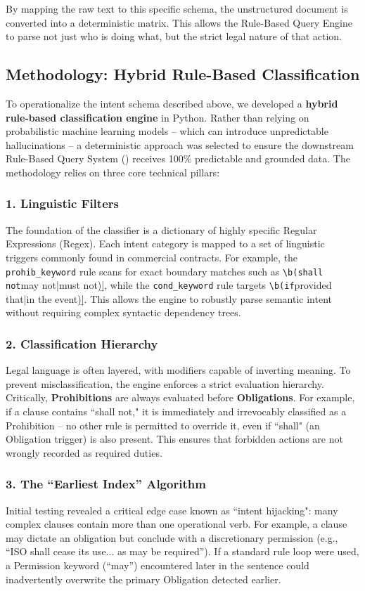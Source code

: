 \documentclass[twoside,final]{hcmut-report}
\newcommand{\result}[1]{\fcolorbox{red}{white}{#1}}
\begin{document}
By mapping the raw text to this specific schema, the unstructured document is converted into a deterministic matrix. This allows the Rule-Based Query Engine to parse not just who is doing what, but the strict legal nature of that action.

\subsection{Methodology: Hybrid Rule-Based Classification}
To operationalize the intent schema described above, we developed a \textbf{hybrid rule-based classification engine} in Python. Rather than relying on probabilistic machine learning models -- which can introduce unpredictable hallucinations -- a deterministic approach was selected to ensure the downstream Rule-Based Query System (\result{Assignment~\ref{assignment_3}}) receives 100\% predictable and grounded data. The methodology relies on three core technical pillars:

\subsubsection*{1. Linguistic Filters}
The foundation of the classifier is a dictionary of highly specific Regular Expressions (Regex). Each intent category is mapped to a set of linguistic triggers commonly found in commercial contracts. For example, the \texttt{prohib\_keyword} rule scans for exact boundary matches such as \verb|\b(shall not|may not|must not)\b|, while the \texttt{cond\_keyword} rule targets \verb|\b(if|provided that|in the event)\b|. This allows the engine to robustly parse semantic intent without requiring complex syntactic dependency trees.

\subsubsection*{2. Classification Hierarchy}
Legal language is often layered, with modifiers capable of inverting meaning. To prevent misclassification, the engine enforces a strict evaluation hierarchy. Critically, \textbf{Prohibitions} are always evaluated before \textbf{Obligations}. For example, if a clause contains ``shall not," it is immediately and irrevocably classified as a Prohibition -- no other rule is permitted to override it, even if ``shall" (an Obligation trigger) is also present. This ensures that forbidden actions are not wrongly recorded as required duties.

\subsubsection*{3. The ``Earliest Index'' Algorithm}
Initial testing revealed a critical edge case known as ``intent hijacking": many complex clauses contain more than one operational verb. For example, a clause may dictate an obligation but conclude with a discretionary permission (e.g., ``ISO shall cease its use... as may be required''). If a standard rule loop were used, a Permission keyword (``may'') encountered later in the sentence could inadvertently overwrite the primary Obligation detected earlier.
\end{document}
